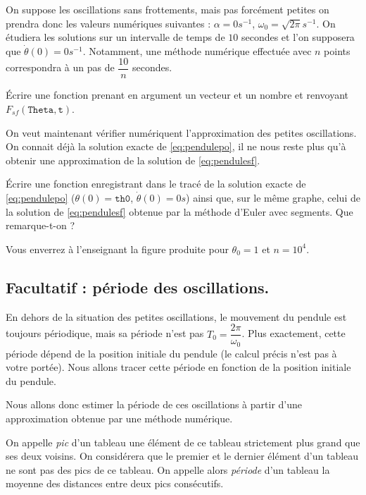 On suppose les oscillations sans frottements, mais pas forcément petites on prendra donc les valeurs numériques suivantes : $\alpha = 0 s^{-1}$, $\omega_0 = \sqrt{2\pi} s^{-1}$.
On étudiera les solutions sur un intervalle de temps de $10$ secondes et l'on supposera que $\dot{\theta}(0) = 0s^{-1}$. 
Notamment, une méthode numérique effectuée avec $n$ points correspondra à un pas de $\dfrac{10}{n}$ secondes. 


\question{} \'Ecrire une fonction  prenant en argument un vecteur  et un nombre  et renvoyant $F_{sf}(\texttt{Theta},\texttt{t})$.

\bigskip{}

On veut maintenant vérifier numériquent l'approximation des petites oscillations. On connait déjà la solution exacte de \eqref{eq:pendulepo}, il ne nous reste plus qu'à obtenir une approximation de la solution de \eqref{eq:pendulesf}. 

\medskip{}

\question{\label{qu:tracesf}} \'Ecrire une fonction  enregistrant dans  le tracé de la solution exacte de \eqref{eq:pendulepo} ($\theta(0) = \texttt{th0}$, $\dot{\theta}(0) = 0s$) ainsi que, sur le même graphe, celui de la solution de \eqref{eq:pendulesf} obtenue par la méthode d'Euler avec  segments.  
Que remarque-t-on ? 

Vous enverrez à l'enseignant la figure produite pour $\theta_0 = 1$ et $n=10^4$. 

\subsection{Facultatif : période des oscillations.}

En dehors de la situation des petites oscillations, le mouvement du pendule est toujours périodique, mais sa période n'est pas $T_0 = \dfrac{2\pi}{\omega_0}$. 
Plus exactement, cette période dépend de la position initiale du pendule (le calcul précis n'est pas à votre portée). Nous allons tracer cette période en fonction de la position initiale du pendule.

Nous allons donc estimer la période de ces oscillations à partir d'une approximation obtenue par une méthode numérique. 

\medskip{}

On appelle \emph{pic} d'un tableau une élément de ce tableau strictement plus grand que ses deux voisins. 
On considérera que le premier et le dernier élément d'un tableau ne sont pas des pics de ce tableau. 
On appelle alors \emph{période} d'un tableau la moyenne des distances entre deux pics consécutifs. 

